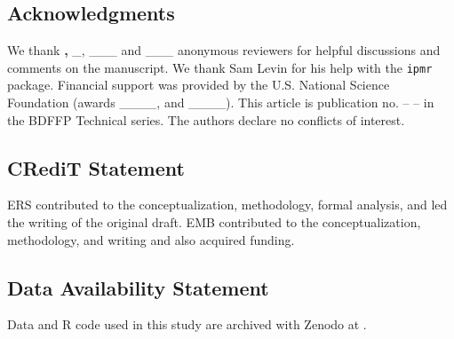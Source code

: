 \documentclass[
]{article}
\begin{document}
\hypertarget{acknowledgments}{%
\subsection{Acknowledgments}\label{acknowledgments}}

We thank \textbf{,} \_, \_\_\_ and \_\_\_ anonymous reviewers for
helpful discussions and comments on the manuscript. We thank Sam Levin
for his help with the \texttt{ipmr} package. Financial support was
provided by the U.S. National Science Foundation (awards \_\_\_\_, and
\_\_\_\_). This article is publication no. -- -- in the BDFFP Technical
series. The authors declare no conflicts of interest.

\hypertarget{credit-statement}{%
\subsection{CRediT Statement}\label{credit-statement}}

ERS contributed to the conceptualization, methodology, formal analysis,
and led the writing of the original draft. EMB contributed to the
conceptualization, methodology, and writing and also acquired funding.

\hypertarget{data-availability-statement}{%
\subsection{Data Availability
Statement}\label{data-availability-statement}}

Data and R code used in this study are archived with Zenodo at .

\pagebreak
\end{document}
